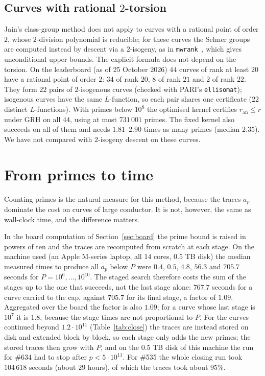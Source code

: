 \documentclass[11pt]{amsart}
\theoremstyle{remark}
\theoremstyle{definition}
\newcommand{\ran}{r_{\mathrm{an}}}
\begin{document}
\subsection*{\texorpdfstring{Curves with rational $2$-torsion}{Curves with rational 2-torsion}}\label{sec:torsion}
Jain's class-group method does not apply to curves with a rational point of order $2$, whose $2$-division polynomial is reducible; for these curves the Selmer groups are computed instead by descent via a $2$-isogeny, as in \texttt{mwrank}~\cite{Cremona}, which gives unconditional upper bounds. The explicit formula does not depend on the torsion. On the leaderboard (as of 25 October 2026) $44$ curves of rank at least $20$ have a rational point of order $2$: $34$ of rank $20$, $8$ of rank $21$ and $2$ of rank $22$. They form $22$ pairs of $2$-isogenous curves (checked with PARI's \texttt{ellisomat}); isogenous curves have the same $L$-function, so each pair shares one certificate ($22$ distinct $L$-functions). With primes below $10^{8}$ the optimised kernel certifies $\ran\le r$ under GRH on all $44$, using at most $731\,001$ primes. The fixed kernel also succeeds on all of them and needs $1.81$--$2.90$ times as many primes (median $2.35$). We have not compared with $2$-isogeny descent on these curves.

\section{From primes to time}
\label{sec:time}

Counting primes is the natural measure for this method, because the traces $a_p$ dominate the
cost on curves of large conductor. It is not, however, the same as wall-clock time, and the
difference matters.

In the board computation of Section~\ref{sec:board} the prime bound is raised in powers of ten and
the traces are recomputed from scratch at each stage. On the machine used (an Apple M-series laptop, all $14$ cores, $0.5$ TB disk) the median measured times to produce all $a_p$ below $P$ were $0.4$, $0.5$, $4.8$, $56.3$ and
$705.7$ seconds for $P=10^6,\dots,10^{10}$. The staged search therefore costs the sum of the stages up
to the one that succeeds, not the last stage alone: $767.7$ seconds for a curve carried to the cap,
against $705.7$ for its final stage, a factor of $1.09$. Aggregated over the board the factor is also
$1.09$; for a curve whose last stage is $10^7$ it is $1.8$, because the stage times are not
proportional to $P$. For the curves continued beyond $1.2\cdot10^{11}$ (Table~\ref{tab:close}) the traces are instead stored on disk and extended block by block, so each stage only adds the new primes; the stored traces then grow with $P$, and on the $0.5$ TB disk of this machine the run for \#634 had to stop after $p<5\cdot10^{11}$. For \#535 the whole closing run took $104\,618$ seconds (about $29$ hours), of which the traces took about $95\%$.
\end{document}

